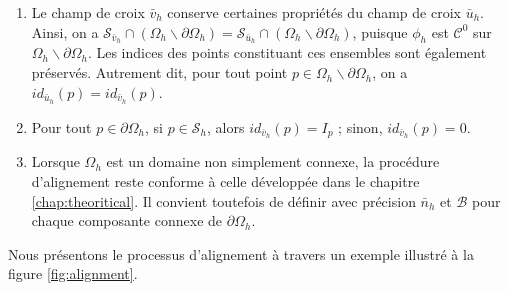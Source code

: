 \begin{remark}
\[\]
\vspace{-1cm}
\begin{enumerate}
\item Le champ de croix $\bar{v}_h$ conserve certaines propriétés du champ de croix $\bar{u}_h$. Ainsi, on a $\mathcal{S}_{\bar{v}_h}\cap(\Omega_h\backslash\partial\Omega_h)=\mathcal{S}_{\bar{u}_h}\cap(\Omega_h\backslash\partial\Omega_h)$, puisque $\phi_h$ est $\mathcal{C}^0$ sur $\Omega_h\backslash\partial\Omega_h$. Les indices des points constituant ces ensembles sont également préservés. Autrement dit, pour tout point $p\in\Omega_h\backslash\partial\Omega_h$, on a $id_{\bar{u}_h}(p)=id_{\bar{v}_h}(p)$.
\item Pour tout $p\in\partial\Omega_h$, si $p\in\mathcal{S}_h$, alors $id_{\bar{v}_h}(p)=I_p$ ; sinon, $id_{\bar{v}_h}
(p)=0$.
\item Lorsque $\Omega_h$ est un domaine non simplement connexe, la procédure d'alignement reste conforme à celle développée dans le chapitre \ref{chap:theoritical}. Il convient toutefois de définir avec précision $\bar{n}_h$ et $\mathcal{B}$ pour chaque composante connexe de $\partial\Omega_h$.
\end{enumerate}
\end{remark}
Nous présentons le processus d'alignement à travers un exemple illustré à la figure \ref{fig:alignment}.

